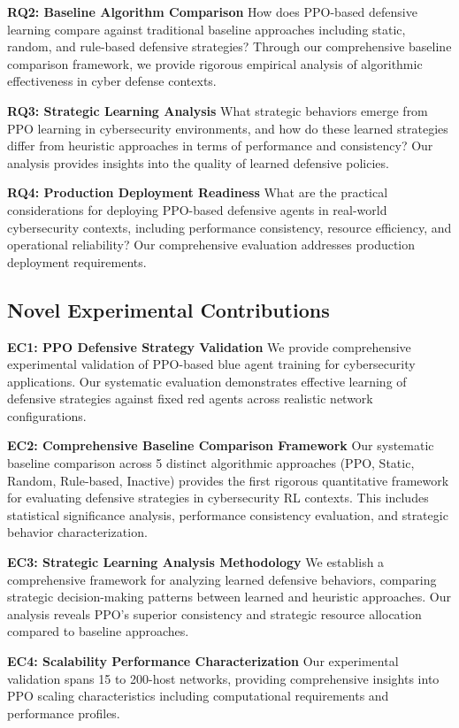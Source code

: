 \documentclass[12pt]{article}
\theoremstyle{definition}
\theoremstyle{plain}
\begin{document}
\textbf{RQ2: Baseline Algorithm Comparison}
How does PPO-based defensive learning compare against traditional baseline approaches including static, random, and rule-based defensive strategies? Through our comprehensive baseline comparison framework, we provide rigorous empirical analysis of algorithmic effectiveness in cyber defense contexts.

\textbf{RQ3: Strategic Learning Analysis}
What strategic behaviors emerge from PPO learning in cybersecurity environments, and how do these learned strategies differ from heuristic approaches in terms of performance and consistency? Our analysis provides insights into the quality of learned defensive policies.

\textbf{RQ4: Production Deployment Readiness}
What are the practical considerations for deploying PPO-based defensive agents in real-world cybersecurity contexts, including performance consistency, resource efficiency, and operational reliability? Our comprehensive evaluation addresses production deployment requirements.

\subsection{Novel Experimental Contributions}

\textbf{EC1: PPO Defensive Strategy Validation}
We provide comprehensive experimental validation of PPO-based blue agent training for cybersecurity applications. Our systematic evaluation demonstrates effective learning of defensive strategies against fixed red agents across realistic network configurations.

\textbf{EC2: Comprehensive Baseline Comparison Framework}
Our systematic baseline comparison across 5 distinct algorithmic approaches (PPO, Static, Random, Rule-based, Inactive) provides the first rigorous quantitative framework for evaluating defensive strategies in cybersecurity RL contexts. This includes statistical significance analysis, performance consistency evaluation, and strategic behavior characterization.

\textbf{EC3: Strategic Learning Analysis Methodology}
We establish a comprehensive framework for analyzing learned defensive behaviors, comparing strategic decision-making patterns between learned and heuristic approaches. Our analysis reveals PPO's superior consistency and strategic resource allocation compared to baseline approaches.

\textbf{EC4: Scalability Performance Characterization}
Our experimental validation spans 15 to 200-host networks, providing comprehensive insights into PPO scaling characteristics including computational requirements and performance profiles.
\end{document}
